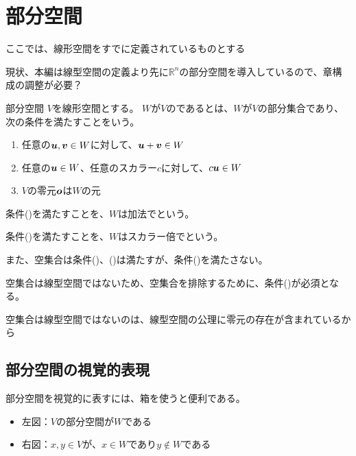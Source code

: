 \documentclass[../../../topic_linear-algebra]{subfiles}
\begin{document}
\sectionline
\section{部分空間}

\begin{mindflow}
  ここでは、線形空間をすでに定義されているものとする
  
  現状、本編は線型空間の定義より先に$\mathbb{R}^n$の部分空間を導入しているので、章構成の調整が必要？
\end{mindflow}

\begin{definition*}{部分空間}
  $V$を線形空間とする。
  $W$が$V$のであるとは、$W$が$V$の部分集合であり、次の条件を満たすことをいう。
  \begin{enumerate}[label=\romanlabel]
    \item 任意の$\vb*{u}, \vb*{v} \in W$に対して、$\vb*{u} + \vb*{v} \in W$
    \item 任意の$\vb*{u} \in W$、任意のスカラー$c$に対して、$c \vb*{u} \in W$
    \item $V$の零元$\vb*{o}$は$W$の元
  \end{enumerate}
\end{definition*}

条件()を満たすことを、$W$は加法でという。

条件()を満たすことを、$W$はスカラー倍でという。

\br

また、空集合は条件()、()は満たすが、条件()を満たさない。

空集合は線型空間ではないため、空集合を排除するために、条件()が必須となる。

\begin{mindflow}
  空集合は線型空間ではないのは、線型空間の公理に零元の存在が含まれているから
\end{mindflow}

\subsection{部分空間の視覚的表現}

部分空間を視覚的に表すには、箱を使うと便利である。

\begin{itemize}
  \item 左図：$V$の部分空間が$W$である
  \item 右図：$x, y \in V$が、$x \in W$であり$y \notin W$である
\end{itemize}
\end{document}

